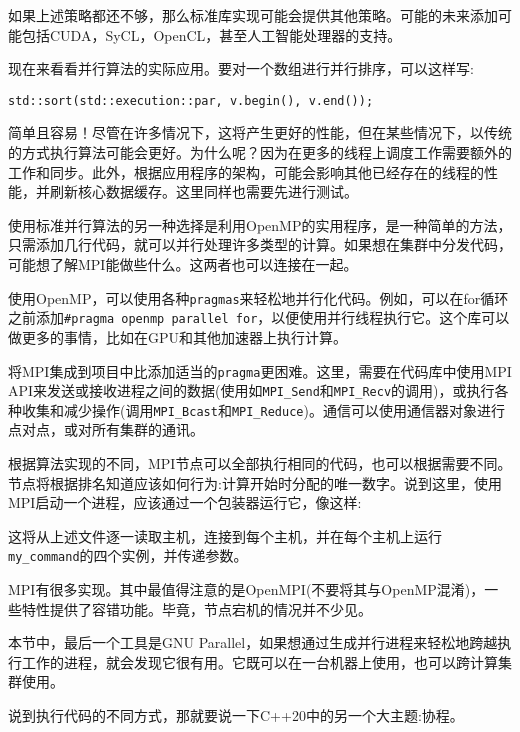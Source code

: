 如果上述策略都还不够，那么标准库实现可能会提供其他策略。可能的未来添加可能包括CUDA，SyCL，OpenCL，甚至人工智能处理器的支持。

现在来看看并行算法的实际应用。要对一个数组进行并行排序，可以这样写:

\begin{lstlisting}[style=styleCXX]
std::sort(std::execution::par, v.begin(), v.end());
\end{lstlisting}

简单且容易！尽管在许多情况下，这将产生更好的性能，但在某些情况下，以传统的方式执行算法可能会更好。为什么呢？因为在更多的线程上调度工作需要额外的工作和同步。此外，根据应用程序的架构，可能会影响其他已经存在的线程的性能，并刷新核心数据缓存。这里同样也需要先进行测试。


使用标准并行算法的另一种选择是利用OpenMP的实用程序，是一种简单的方法，只需添加几行代码，就可以并行处理许多类型的计算。如果想在集群中分发代码，可能想了解MPI能做些什么。这两者也可以连接在一起。

使用OpenMP，可以使用各种\texttt{pragmas}来轻松地并行化代码。例如，可以在for循环之前添加\texttt{\#pragma openmp parallel for}，以便使用并行线程执行它。这个库可以做更多的事情，比如在GPU和其他加速器上执行计算。

将MPI集成到项目中比添加适当的\texttt{pragma}更困难。这里，需要在代码库中使用MPI API来发送或接收进程之间的数据(使用如\texttt{MPI\_Send}和\texttt{MPI\_Recv}的调用)，或执行各种收集和减少操作(调用\texttt{MPI\_Bcast}和\texttt{MPI\_Reduce})。通信可以使用通信器对象进行点对点，或对所有集群的通讯。

根据算法实现的不同，MPI节点可以全部执行相同的代码，也可以根据需要不同。节点将根据排名知道应该如何行为:计算开始时分配的唯一数字。说到这里，使用MPI启动一个进程，应该通过一个包装器运行它，像这样:


这将从上述文件逐一读取主机，连接到每个主机，并在每个主机上运行\texttt{my\_command}的四个实例，并传递参数。

MPI有很多实现。其中最值得注意的是OpenMPI(不要将其与OpenMP混淆)，一些特性提供了容错功能。毕竟，节点宕机的情况并不少见。

本节中，最后一个工具是GNU Parallel，如果想通过生成并行进程来轻松地跨越执行工作的进程，就会发现它很有用。它既可以在一台机器上使用，也可以跨计算集群使用。

说到执行代码的不同方式，那就要说一下C++20中的另一个大主题:协程。




















